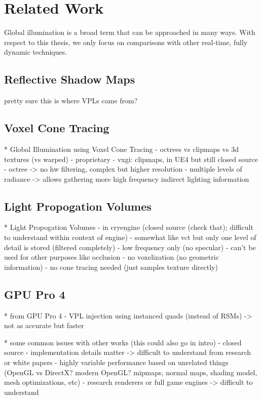 \chapter{Related Work}

Global illumination is a broad term that can be approached in many ways. With respect to this thesis, we only focus on comparisons with other real-time, fully dynamic techniques.

\section{Reflective Shadow Maps}
pretty sure this is where VPLs came from?

\section{Voxel Cone Tracing}
* Global Illumination using Voxel Cone Tracing
    - octrees vs clipmaps vs 3d textures (vs warped)
    - proprietary
    - vxgi: clipmaps, in UE4 but still closed source
    - octree -> no hw filtering, complex but higher resolution
    - multiple levels of radiance -> allows gathering more high frequency indirect lighting information

\section{Light Propogation Volumes}
* Light Propogation Volumes
    - in cryengine (closed source (check that); difficult to understand within context of engine)
    - somewhat like vct but only one level of detail is stored (filtered completely)
        - low frequency only (no specular)
        - can't be used for other purposes like occlusion
    - no voxelization (no geometric information)
    - no cone tracing needed (just samples texture directly)

\section{GPU Pro 4}
* from GPU Pro 4
    - VPL injection using instanced quads (instead of RSMs) -> not as accurate but faster

* some common issues with other works (this could also go in intro)
    - closed source
        - implementation details matter -> difficult to understand from research or white papers
        - highly variable performance based on unrelated things (OpenGL vs DirectX? modern OpenGL? mipmaps, normal maps, shading model, mesh optimizations, etc)
    - research renderers or full game engines -> difficult to understand